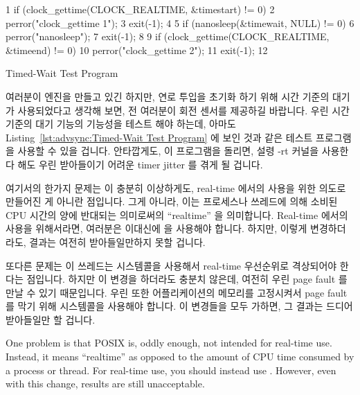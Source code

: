 \begin{listing}[tb]
{ \scriptsize
\begin{verbbox}
 1 if (clock_gettime(CLOCK_REALTIME, &timestart) != 0) {
 2   perror("clock_gettime 1");
 3   exit(-1);
 4 }
 5 if (nanosleep(&timewait, NULL) != 0) {
 6   perror("nanosleep");
 7   exit(-1);
 8 }
 9 if (clock_gettime(CLOCK_REALTIME, &timeend) != 0) {
10   perror("clock_gettime 2");
11   exit(-1);
12 }
\end{verbbox}
}
\centering
\theverbbox
\caption{Timed-Wait Test Program}
\label{lst:advsync:Timed-Wait Test Program}
\end{listing}

여러분이 엔진을 만들고 있긴 하지만, 연로 투입을 초기화 하기 위해 시간 기준의
대기가 사용되었다고 생각해 보면, 전 여러분이 회전 센서를 제공하길 바랍니다.
우린 시간 기준의 대기 기능의 기능성을 테스트 해야 하는데, 아마도
Listing~\ref{lst:advsync:Timed-Wait Test Program} 에 보인 것과 같은 테스트 프로그램을
사용할 수 있을 겁니다.
안타깝게도, 이 프로그램을 돌리면, 설령 -rt 커널을 사용한다 해도 우린 받아들이기
어려운 timer jitter 를 겪게 될 겁니다.

여기서의 한가지 문제는  이 충분히 이상하게도, real-time
에서의 사용을 위한 의도로 만들어진 게 아니란 점입니다.
그게 아니라, 이는 프로세스나 쓰레드에 의해 소비된 CPU 시간의 양에 반대되는
의미로써의 ``realtime'' 을 의미합니다.
Real-time 에서의 사용을 위해서라면, 여러분은 이대신에  을
사용해야 합니다.
하지만, 이렇게 변경하더라도, 결과는 여전히 받아들일만하지 못할 겁니다.

또다른 문제는 이 쓰레드는  시스템콜을 사용해서
real-time 우선순위로 격상되어야 한다는 점입니다.
하지만 이 변경을 하더라도 충분치 않은데, 여전히 우린 page fault 를 만날 수 있기
때문입니다.
우린 또한 어플리케이션의 메모리를 고정시켜서 page fault 를 막기 위해
 시스템콜을 사용해야 합니다.
이 변경들을 모두 가하면, 그 결과는 드디어 받아들일만 할 겁니다.
\iffalse

One problem is that POSIX  is, oddly enough, not intended
for real-time use.
Instead, it means ``realtime'' as opposed to the amount of CPU time
consumed by a process or thread.
For real-time use, you should instead use .
However, even with this change, results are still unacceptable.

